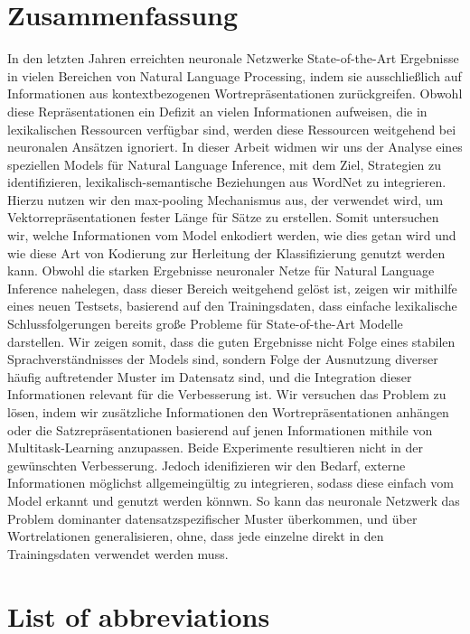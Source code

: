 \documentclass[article,type=msc,11pt,colorback,accentcolor=tud9c]{tudthesis}
\begin{document}
\section*{Zusammenfassung}
In den letzten Jahren erreichten neuronale Netzwerke State-of-the-Art Ergebnisse in vielen Bereichen von Natural Language Processing, indem sie ausschließlich auf Informationen aus kontextbezogenen Wortrepräsentationen zurückgreifen. Obwohl diese Repräsentationen ein Defizit an vielen Informationen aufweisen, die in lexikalischen Ressourcen verfügbar sind, werden diese Ressourcen weitgehend bei neuronalen Ansätzen ignoriert. In dieser Arbeit widmen wir uns der Analyse eines speziellen Models für Natural Language Inference, mit dem Ziel, Strategien zu identifizieren, lexikalisch-semantische Beziehungen aus WordNet zu integrieren. Hierzu nutzen wir den max-pooling Mechanismus aus, der verwendet wird, um Vektorrepräsentationen fester Länge für Sätze zu erstellen. Somit untersuchen wir, welche Informationen vom Model enkodiert werden, wie dies getan wird und wie diese Art von Kodierung zur Herleitung der Klassifizierung genutzt werden kann. Obwohl die starken Ergebnisse neuronaler Netze für Natural Language Inference nahelegen, dass dieser Bereich  weitgehend gelöst ist, zeigen wir mithilfe eines neuen Testsets, basierend auf den Trainingsdaten, dass einfache lexikalische Schlussfolgerungen bereits große Probleme für State-of-the-Art Modelle darstellen.  Wir zeigen somit, dass die guten Ergebnisse nicht Folge eines stabilen Sprachverständnisses der Models sind, sondern Folge der Ausnutzung diverser häufig auftretender Muster im Datensatz sind, und die Integration dieser Informationen relevant für die Verbesserung ist. Wir versuchen das Problem zu lösen, indem wir zusätzliche Informationen den Wortrepräsentationen anhängen oder die Satzrepräsentationen basierend auf jenen Informationen mithile von Multitask-Learning anzupassen. Beide Experimente resultieren nicht in der gewünschten Verbesserung. Jedoch idenifizieren wir den Bedarf, externe Informationen möglichst allgemeingültig zu integrieren, sodass diese einfach vom Model erkannt und genutzt werden könnwn. So kann das neuronale Netzwerk das Problem dominanter datensatzspezifischer Muster überkommen, und über Wortrelationen generalisieren, ohne, dass jede einzelne direkt in den Trainingsdaten verwendet werden muss.
\addtocounter{section}{0}

\newpage\cleardoublepage
\section*{List of abbreviations}
\addtocounter{section}{0}
\end{document}
